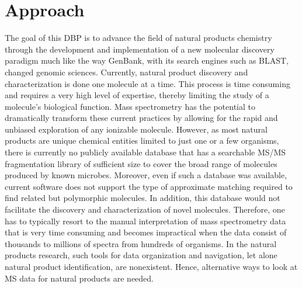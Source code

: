 \documentclass[arial,11pt]{article}
\begin{document}
\section{Approach}


The goal of this DBP is to advance the field of natural products chemistry through the development and implementation of a new  molecular discovery paradigm much like the way GenBank, with its search engines such as BLAST, changed genomic sciences.
Currently, natural product discovery and characterization is done one molecule at a time. This process is time consuming
and requires a very high level of expertise, thereby limiting the study of a molecule's biological function. Mass spectrometry has the potential to dramatically transform these current practices by allowing for the rapid and unbiased exploration of any ionizable molecule. However, as most natural products are unique chemical entities limited to just one or a few organisms, there is currently no publicly available database that has a searchable MS/MS fragmentation library of sufficient size to cover the broad range of molecules produced by  known microbes. Moreover, even if such a database was available, current software does not support the type of approximate matching required to find related but polymorphic molecules. In addition, this database would not facilitate the discovery and characterization of novel molecules. Therefore, one has to typically resort to the manual interpretation of mass spectrometry data
that is very time consuming and becomes impractical when the data consist of thousands to millions of  spectra from hundreds of organisms. In the natural products research, such tools for data organization and navigation, let alone natural product identification, are nonexistent. Hence, alternative ways to look at MS data for natural products are needed.
\end{document}
